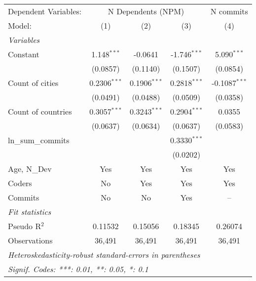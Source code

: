 
\begingroup
\centering
\begin{tabular}{lcccc}
   \tabularnewline \midrule \midrule
   Dependent Variables: & \multicolumn{3}{c}{N Dependents (NPM)} & N commits\\
   Model:             & (1)            & (2)            & (3)            & (4)\\  
   \midrule
   \emph{Variables}\\
   Constant           & 1.148$^{***}$  & -0.0641        & -1.746$^{***}$ & 5.090$^{***}$\\   
                      & (0.0857)       & (0.1140)       & (0.1507)       & (0.0854)\\   
   Count of cities    & 0.2306$^{***}$ & 0.1906$^{***}$ & 0.2818$^{***}$ & -0.1087$^{***}$\\   
                      & (0.0491)       & (0.0488)       & (0.0509)       & (0.0358)\\   
   Count of countries & 0.3057$^{***}$ & 0.3243$^{***}$ & 0.2904$^{***}$ & 0.0355\\   
                      & (0.0637)       & (0.0634)       & (0.0637)       & (0.0583)\\   
   ln\_sum\_commits   &                &                & 0.3330$^{***}$ &   \\   
                      &                &                & (0.0202)       &   \\   
   Age, N\_Dev        & Yes            & Yes            & Yes            & Yes\\  
   Coders             & No             & Yes            & Yes            & Yes\\  
   Commits            & No             & No             & Yes            & --\\  
   \midrule
   \emph{Fit statistics}\\
   Pseudo R$^2$       & 0.11532        & 0.15056        & 0.18345        & 0.26074\\  
   Observations       & 36,491         & 36,491         & 36,491         & 36,491\\  
   \midrule \midrule
   \multicolumn{5}{l}{\emph{Heteroskedasticity-robust standard-errors in parentheses}}\\
   \multicolumn{5}{l}{\emph{Signif. Codes: ***: 0.01, **: 0.05, *: 0.1}}\\
\end{tabular}
\par\endgroup


